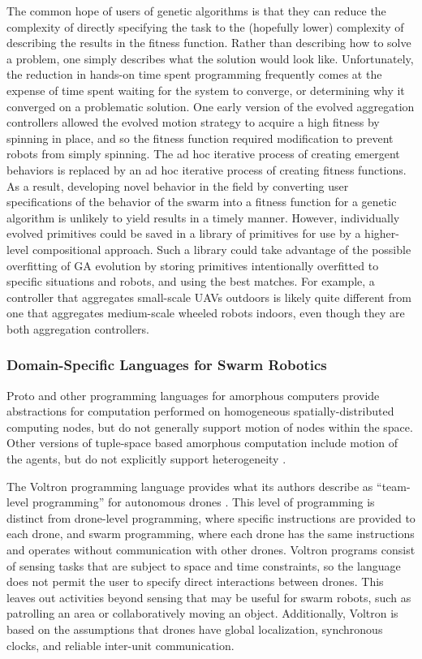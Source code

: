 The common hope of users of genetic algorithms is that they can reduce the complexity of directly specifying the task to the (hopefully lower) complexity of describing the results in the fitness function.
Rather than describing how to solve a problem, one simply describes what the solution would look like. 
Unfortunately, the reduction in hands-on time spent programming frequently comes at the expense of time spent waiting for the system to converge, or determining why it converged on a problematic solution. 
One early version of the evolved aggregation controllers allowed the evolved motion strategy to acquire a high fitness by spinning in place, and so the fitness function required modification to prevent robots from simply spinning. 
The ad hoc iterative process of creating emergent behaviors is replaced by an ad hoc iterative process of creating fitness functions.
As a result, developing novel behavior in the field by converting user specifications of the behavior of the swarm into a fitness function for a genetic algorithm is unlikely to yield results in a timely manner. 
However, individually evolved primitives could be saved in a library of primitives for use by a higher-level compositional approach. 
Such a library could take advantage of the possible overfitting of GA evolution by storing primitives intentionally overfitted to specific situations and robots, and using the best matches. 
For example, a controller that aggregates small-scale UAVs outdoors is likely quite different from one that aggregates medium-scale wheeled robots indoors, even though they are both aggregation controllers. 

\subsubsection{Domain-Specific Languages for Swarm Robotics}

Proto and other programming languages for amorphous computers provide abstractions for computation performed on homogeneous spatially-distributed computing nodes, but do not generally support motion of nodes within the space. 
Other versions of tuple-space based amorphous computation include motion of the agents, but do not explicitly support heterogeneity \cite{viroli2012linda}.

The Voltron programming language provides what its authors describe as ``team-level programming'' for autonomous drones \cite{mottola2014team}.
This level of programming is distinct from drone-level programming, where specific instructions are provided to each drone, and swarm programming, where each drone has the same instructions and operates without communication with other drones.
Voltron programs consist of sensing tasks that are subject to space and time constraints, so the language does not permit the user to specify direct interactions between drones. 
This leaves out activities beyond sensing that may be useful for swarm robots, such as patrolling an area or collaboratively moving an object.
Additionally, Voltron is based on the assumptions that drones have global localization, synchronous clocks, and reliable inter-unit communication.   

